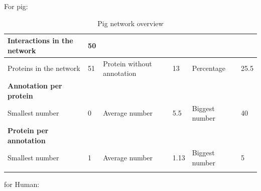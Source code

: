 \documentclass[10pt,a4paper]{article}
\begin{document}
\begin{enumerate}
	For pig: 
	
	\begin{table}[H]
		\centering
		\caption{Pig network overview}
		\vspace*{1mm}
		\label{pignetworkoverview}
		\begin{tabular}{llllll}
			\hline
			\multicolumn{1}{|l|}{Interactions in the network}     & \multicolumn{1}{l|}{50} & \multicolumn{1}{l|}{}                           & \multicolumn{1}{l|}{}    & \multicolumn{1}{l|}{}               & \multicolumn{1}{l|}{}     \\ \hline
			\multicolumn{1}{|l|}{Proteins in the network}         & \multicolumn{1}{l|}{51} & \multicolumn{1}{l|}{Protein without annotation} & \multicolumn{1}{l|}{13}  & \multicolumn{1}{l|}{Percentage}     & \multicolumn{1}{l|}{25.5} \\ \hline
			\multicolumn{1}{|l|}{\textbf{Annotation per protein}} & \multicolumn{1}{l|}{}   & \multicolumn{1}{l|}{}                           & \multicolumn{1}{l|}{}    & \multicolumn{1}{l|}{}               & \multicolumn{1}{l|}{}     \\ \hline
			\multicolumn{1}{|l|}{Smallest number}                 & \multicolumn{1}{l|}{0}  & \multicolumn{1}{l|}{Average number}             & \multicolumn{1}{l|}{5.5} & \multicolumn{1}{l|}{Biggest number} & \multicolumn{1}{l|}{40}   \\ \hline
			\multicolumn{1}{|l|}{\textbf{Protein per annotation}} & \multicolumn{1}{l|}{}   & \multicolumn{1}{l|}{}                           & \multicolumn{1}{l|}{}    & \multicolumn{1}{l|}{}               & \multicolumn{1}{l|}{}     \\ \hline
			\multicolumn{1}{|l|}{Smallest number}                 & \multicolumn{1}{l|}{1}  & \multicolumn{1}{l|}{Average number}             & \multicolumn{1}{l|}{1.13} & \multicolumn{1}{l|}{Biggest number} & \multicolumn{1}{l|}{5} \\ \hline
			&                         &                                                 &                          &                                     &                          
		\end{tabular}
	\end{table}
	
	
	for Human: 
	

\end{enumerate}
\end{document}
